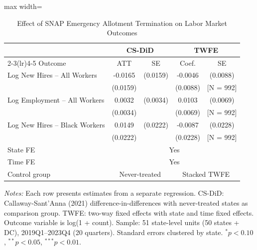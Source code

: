 \begin{table}[htbp]
\centering
\caption{Effect of SNAP Emergency Allotment Termination on Labor Market Outcomes}
\label{tab:main}
\begin{adjustbox}{max width=\textwidth}
\begin{threeparttable}
\begin{tabular}{lcccc}
\hline\hline
 & \multicolumn{2}{c}{CS-DiD} & \multicolumn{2}{c}{TWFE} \\
\cmidrule(lr){2-3}\cmidrule(lr){4-5}
Outcome & ATT & SE & Coef. & SE \\
\hline
Log New Hires -- All Workers & -0.0165 & (0.0159) & -0.0046 & (0.0088) \\
 & (0.0159) & & (0.0088) & [N = 992] \\[4pt]
Log Employment -- All Workers & 0.0032 & (0.0034) & 0.0103 & (0.0069) \\
 & (0.0034) & & (0.0069) & [N = 992] \\[4pt]
Log New Hires -- Black Workers & 0.0149 & (0.0222) & -0.0087 & (0.0228) \\
 & (0.0222) & & (0.0228) & [N = 992] \\[4pt]
\hline
State FE & \multicolumn{4}{c}{Yes} \\
Time FE  & \multicolumn{4}{c}{Yes} \\
Control group & \multicolumn{2}{c}{Never-treated} & \multicolumn{2}{c}{Stacked TWFE} \\
\hline\hline
\end{tabular}
\begin{tablenotes}[flushleft]
\footnotesize
\textit{Notes:} Each row presents estimates from a separate regression. CS-DiD: Callaway-Sant'Anna (2021) difference-in-differences with never-treated states as comparison group. TWFE: two-way fixed effects with state and time fixed effects. Outcome variable is log(1 + count). Sample: 51 state-level units (50 states + DC), 2019Q1--2023Q4 (20 quarters). Standard errors clustered by state. $^{*}p<0.10$, $^{**}p<0.05$, $^{***}p<0.01$.
\end{tablenotes}
\end{threeparttable}
\end{adjustbox}
\end{table}
